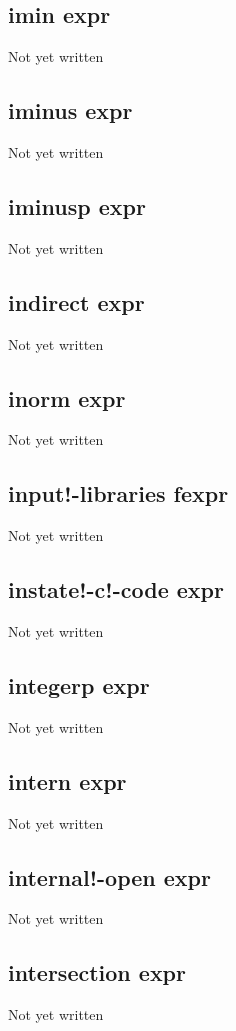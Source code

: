 \documentclass[a4paper,11pt]{article}
\begin{document}
\subsection{\ttfamily imin expr}
Not yet written

\subsection{\ttfamily iminus expr}
Not yet written

\subsection{\ttfamily iminusp expr}
Not yet written

\subsection{\ttfamily indirect expr}
Not yet written

\subsection{\ttfamily inorm expr}
Not yet written

\subsection{\ttfamily input!-libraries fexpr}
Not yet written

\subsection{\ttfamily instate!-c!-code expr}
Not yet written

\subsection{\ttfamily integerp expr}
Not yet written

\subsection{\ttfamily intern expr}
Not yet written

\subsection{\ttfamily internal!-open expr}
Not yet written

\subsection{\ttfamily intersection expr}
Not yet written
\end{document}
